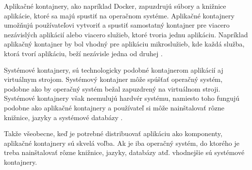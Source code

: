 Aplikačné kontajnery, ako napríklad Docker, zapuzdrujú súbory a knižnice aplikácie, ktoré sa majú spustiť na operačnom systéme. Aplikačné kontajnery umožňujú používateľovi vytvoriť a spustiť samostatný kontajner pre viacero nezávislých aplikácií alebo viacero služieb, ktoré tvoria jednu aplikáciu. Napríklad aplikačný kontajner by bol vhodný pre aplikáciu mikroslužieb, kde každá služba, ktorá tvorí aplikáciu, beží nezávisle jedna od druhej \cite{systemvsapli1}.

Systémové kontajnery, sú technologicky podobné kontajnerom aplikácií aj virtuálnym strojom. Systémový kontajner môže spúšťať operačný systém, podobne ako by operačný systém bežal zapuzdrený na virtuálnom stroji. Systémové kontajnery však neemulujú hardvér systému, namiesto toho fungujú podobne ako aplikačné kontajnery a používateľ si môže nainštalovať rôzne knižnice, jazyky a systémové databázy \cite{systemvsapli}.

Takže všeobecne, keď je potrebné distribuovať aplikáciu ako komponenty, aplikačné kontajnery sú skvelá voľba. Ak je iba operačný systém, do ktorého je treba nainštalovať rôzne knižnice, jazyky, databázy atď. vhodnejšie sú systémové kontajnery.
